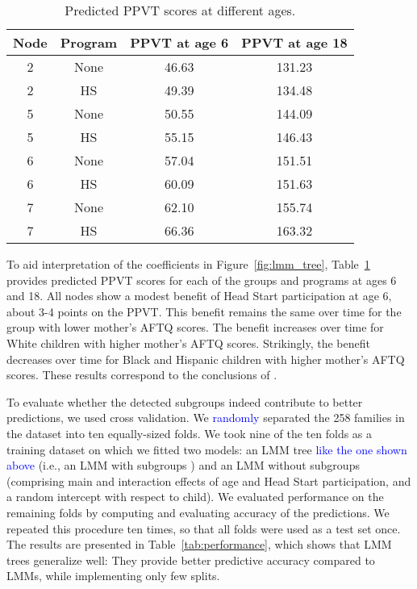 \documentclass[doc,floatsintext,natbib]{apa7}
\newcommand{\edc}[1]{\textcolor{blue}{#1}}
\begin{document}
\begin{table}

\caption{\label{tab:predictions}Predicted PPVT scores at different ages.}
\begin{tabular}[t]{cccc}
\toprule
Node & Program & PPVT at age 6 & PPVT at age 18\\
\midrule
2 & None & 46.63 & 131.23\\
2 & HS & 49.39 & 134.48\\
5 & None & 50.55 & 144.09\\
5 & HS & 55.15 & 146.43\\
6 & None & 57.04 & 151.51\\
6 & HS & 60.09 & 151.63\\
7 & None & 62.10 & 155.74\\
7 & HS & 66.36 & 163.32\\
\bottomrule
\end{tabular}
\end{table}
To aid interpretation of the coefficients in Figure~\ref{fig:lmm_tree}, Table~\ref{tab:predictions} provides predicted PPVT scores for each of the groups and programs at ages 6  and 18. All nodes show a modest benefit of Head Start participation at age 6, about 3-4 points on the PPVT. This benefit remains the same over time for the group with lower mother's AFTQ scores. The benefit increases over time for White children with higher mother's AFTQ scores. Strikingly, the benefit decreases over time for Black and Hispanic children with higher mother's AFTQ scores. These results correspond to the conclusions of \cite{Demi09}. 

To evaluate whether the detected subgroups indeed contribute to better predictions, we used cross validation. We \edc{randomly} separated the 258 families in the dataset into ten equally-sized folds. We took nine of the ten folds as a training dataset on which we fitted two models: an LMM tree \edc{like the one shown above} (i.e., an LMM with subgroups ) and an LMM without subgroups (comprising main and interaction effects of age and Head Start participation, and a random intercept with respect to child). We evaluated performance on the remaining folds by computing and evaluating accuracy of the predictions.  We repeated this procedure ten times, so that all folds were used as a test set once. The results are presented in Table~\ref{tab:performance}, which shows that LMM trees generalize well: They provide better predictive accuracy compared to LMMs, while implementing only few splits. 
\end{document}
